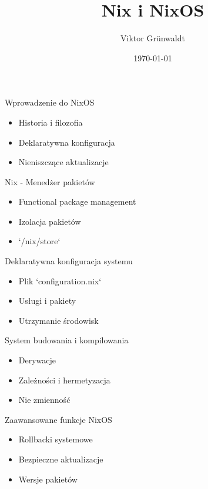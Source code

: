 \documentclass{beamer}
\title{Nix i NixOS}
\author{Viktor Grünwaldt}
\date{\today}
\begin{document}
\begin{frame}
    \titlepage
\end{frame}

\begin{frame}{Wprowadzenie do NixOS}
    \begin{itemize}
        \item Historia i filozofia
        \item Deklaratywna konfiguracja
        \item Nieniszczące aktualizacje
    \end{itemize}
\end{frame}

\begin{frame}{Nix - Menedżer pakietów}
    \begin{itemize}
        \item Functional package management
        \item Izolacja pakietów
        \item `/nix/store`
    \end{itemize}
\end{frame}

\begin{frame}{Deklaratywna konfiguracja systemu}
    \begin{itemize}
        \item Plik `configuration.nix`
        \item Usługi i pakiety
        \item Utrzymanie środowisk
    \end{itemize}
\end{frame}

\begin{frame}{System budowania i kompilowania}
    \begin{itemize}
        \item Derywacje
        \item Zależności i hermetyzacja
        \item Nie zmienność
    \end{itemize}
\end{frame}

\begin{frame}{Zaawansowane funkcje NixOS}
    \begin{itemize}
        \item Rollbacki systemowe
        \item Bezpieczne aktualizacje
        \item Wersje pakietów
    \end{itemize}
\end{frame}
\end{document}
